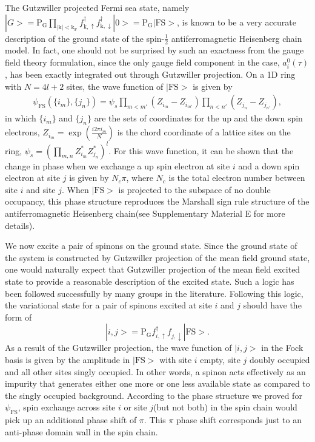 \documentclass[12pt]{article}
\begin{document}
The Gutzwiller projected Fermi sea state, namely $|G>=\mathrm{P_{G}}\prod_{\mathrm{|k|<k_{F}}}f^{\dagger}_{\mathrm{k},\uparrow}f^{\dagger}_{\mathrm{k},\downarrow}|0>=\mathrm{P_{G}}|\mathrm{FS}>$, is known to be a very accurate description of the ground state of the spin-$\frac{1}{2}$ antiferromagnetic Heisenberg chain model\cite{Ogata}. In fact, one should not be surprised by such an exactness from the gauge field theory formulation, since the only gauge field component in the case, $a^{0}_{i}(\tau)$, has been exactly integrated out through Gutzwiller projection. On a 1D ring with $N=4l+2$ sites, the wave function of $|\mathrm{FS}>$ is given by 
\begin{eqnarray}
\psi_{\mathrm{FS}}(\{i_{m}\},\{j_{n}\})=\psi_{s}\prod_{m<m'}(Z_{i_{m}}-Z_{i_{m'}})\prod_{n<n'}(Z_{j_{n}}-Z_{j_{n'}}),\nonumber
\end{eqnarray}
in which $\{i_{m}\}$ and $\{j_{n}\}$ are the sets of coordinates for the up and the down spin electrons, $Z_{i_{m}}=\exp(\frac{i 2\pi i_{m}}{N})$ is the chord coordinate of a lattice sites on the ring\cite{Laughlin}, $\psi_{s}=(\prod_{m,n}Z^{*}_{i_{m}}Z^{*}_{j_{n}})^{l}$. For this wave function, it can be shown that the change in phase when we exchange a up spin electron at site $i$ and a down spin electron at site $j$ is given by $N_{c}\pi$, where $N_{c}$ is the total electron number between site $i$ and site $j$\cite{Yang1}. When $|\mathrm{FS}>$ is projected to the subspace of no double occupancy, this phase structure reproduces the Marshall sign rule structure of the antiferromagnetic Heisenberg chain\cite{Marshall,Weng}(see Supplementary Material E for more details).

We now excite a pair of spinons on the ground state. Since the ground state of the system is constructed by Gutzwiller projection of the mean field ground state, one would naturally expect that Gutzwiller projection of the mean field excited state to provide a reasonable description of the excited state. Such a logic has been followed successfully by many groups in the literature\cite{Yunoki1,Nave,Yang2,Li1,Ivanov}.  Following this logic, the variational state for a pair of spinons excited at site $i$ and $j$ should have the form of
\begin{equation}
|i,j>=\mathrm{P_{G}}f^{\dagger}_{i,\uparrow}f_{j,\downarrow}|\mathrm{FS}>.
\end{equation}
As a result of the Gutzwiller projection, the wave function of $|i,j>$ in the Fock basis is given by the amplitude in $|\mathrm{FS}>$ with site $i$ empty, site $j$ doubly occupied and all other sites singly occupied. In other words, a spinon acts effectively as an impurity that generates either one more or one less available state as compared to the singly occupied background. According to the phase structure we proved for $\psi_{\mathrm{FS}}$, spin exchange across site $i$ or site $j$(but not both) in the spin chain would pick up an additional phase shift of $\pi$. This $\pi$ phase shift corresponds just to an anti-phase domain wall in the spin chain.
\end{document}
